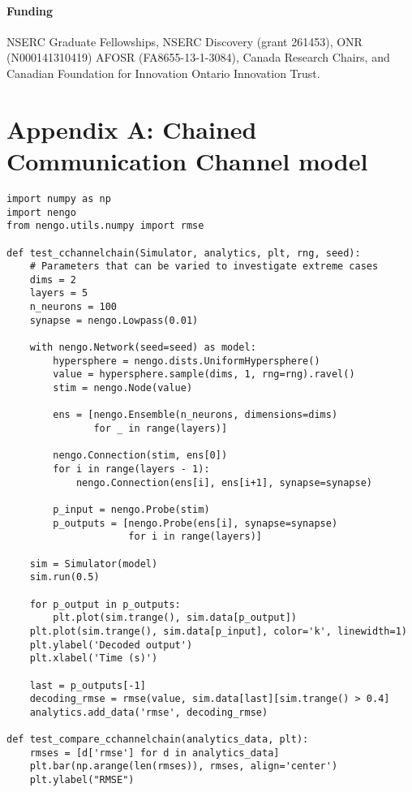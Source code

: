 \documentclass{frontiersSCNS}
\begin{document}
\paragraph{Funding\textcolon}
NSERC Graduate Fellowships,
NSERC Discovery (grant 261453),
ONR (N000141310419)
AFOSR (FA8655-13-1-3084),
Canada Research Chairs,
and Canadian Foundation for Innovation
Ontario Innovation Trust.




\clearpage

\section*{Appendix A: Chained Communication Channel model}

\begin{lstlisting}
import numpy as np
import nengo
from nengo.utils.numpy import rmse

def test_cchannelchain(Simulator, analytics, plt, rng, seed):
    # Parameters that can be varied to investigate extreme cases
    dims = 2
    layers = 5
    n_neurons = 100
    synapse = nengo.Lowpass(0.01)

    with nengo.Network(seed=seed) as model:
        hypersphere = nengo.dists.UniformHypersphere()
        value = hypersphere.sample(dims, 1, rng=rng).ravel()
        stim = nengo.Node(value)

        ens = [nengo.Ensemble(n_neurons, dimensions=dims)
               for _ in range(layers)]

        nengo.Connection(stim, ens[0])
        for i in range(layers - 1):
            nengo.Connection(ens[i], ens[i+1], synapse=synapse)

        p_input = nengo.Probe(stim)
        p_outputs = [nengo.Probe(ens[i], synapse=synapse)
                     for i in range(layers)]

    sim = Simulator(model)
    sim.run(0.5)

    for p_output in p_outputs:
        plt.plot(sim.trange(), sim.data[p_output])
    plt.plot(sim.trange(), sim.data[p_input], color='k', linewidth=1)
    plt.ylabel('Decoded output')
    plt.xlabel('Time (s)')

    last = p_outputs[-1]
    decoding_rmse = rmse(value, sim.data[last][sim.trange() > 0.4]
    analytics.add_data('rmse', decoding_rmse)

def test_compare_cchannelchain(analytics_data, plt):
    rmses = [d['rmse'] for d in analytics_data]
    plt.bar(np.arange(len(rmses)), rmses, align='center')
    plt.ylabel("RMSE")
\end{lstlisting}
\end{document}
